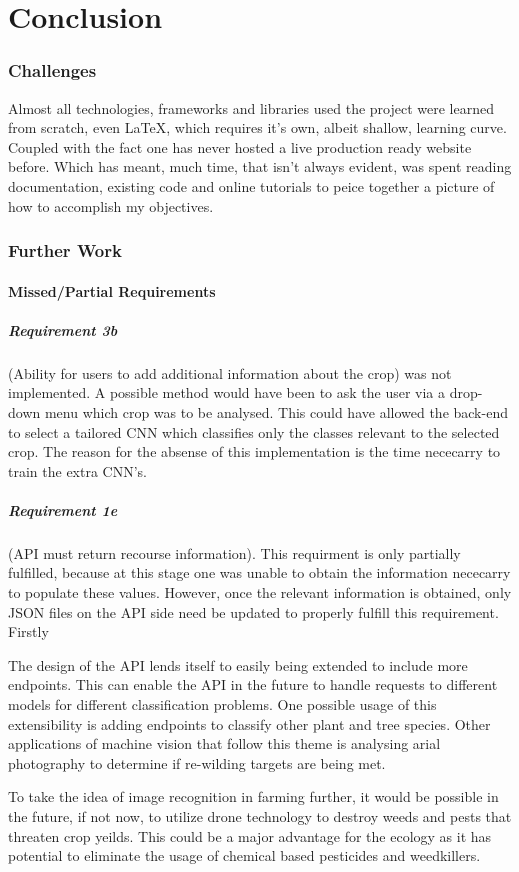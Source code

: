 \chapter{Conclusion}
\label{conclusion}
  \subsection{Challenges}
    Almost all technologies, frameworks and libraries used the project were learned from scratch, even LaTeX, which requires it's own, albeit shallow, learning curve. Coupled with the fact one has never hosted a live production ready website before. Which has meant, much time, that isn't always evident, was spent reading documentation, existing code and online tutorials to peice together a picture of how to accomplish my objectives.

  \subsection{Further Work}
    \subsubsection{Missed/Partial Requirements}
      \paragraph{Requirement 3b}
       (Ability for users to add additional information about the crop) was not implemented. A possible method would have been to ask the user via a drop-down menu which crop was to be analysed. This could have allowed the back-end to select a tailored CNN which classifies only the classes relevant to the selected crop. The reason for the absense of this implementation is the time nececarry to train the extra CNN's.
      \paragraph{Requirement 1e}
        (API must return recourse information). This requirment is only partially fulfilled, because at this stage one was unable to obtain the information nececarry to populate these values. However, once the relevant information is obtained, only JSON files on the API side need be updated to properly fulfill this requirement.
        Firstly

    The design of the API lends itself to easily being extended to include more endpoints. This can enable the API in the future to handle requests to different models for different classification problems. One possible usage of this extensibility is adding endpoints to classify other plant and tree species. Other applications of machine vision that follow this theme is analysing arial photography to determine if re-wilding targets are being met.
    \par
    To take the idea of image recognition in farming further, it would be possible in the future, if not now, to utilize drone technology to destroy weeds and pests that threaten crop yeilds. This could be a major advantage for the ecology as it has potential to eliminate the usage of chemical based pesticides and weedkillers.

